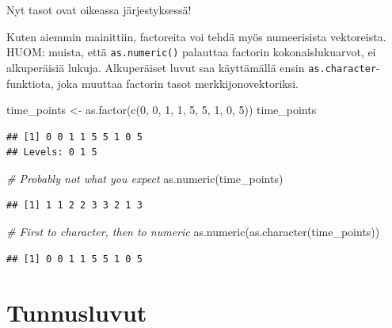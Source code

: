 \documentclass[
]{book}
\newenvironment{Shaded}{\begin{snugshade}}{\end{snugshade}}
\newcommand{\CommentTok}[1]{\textcolor[rgb]{0.56,0.35,0.01}{\textit{#1}}}
\newcommand{\DecValTok}[1]{\textcolor[rgb]{0.00,0.00,0.81}{#1}}
\newcommand{\FunctionTok}[1]{\textcolor[rgb]{0.00,0.00,0.00}{#1}}
\newcommand{\NormalTok}[1]{#1}
\newcommand{\OtherTok}[1]{\textcolor[rgb]{0.56,0.35,0.01}{#1}}
\begin{document}
Nyt tasot ovat oikeassa järjestyksessä!

Kuten aiemmin mainittiin, factoreita voi tehdä myös numeerisista vektoreista. HUOM: muista, että \texttt{as.numeric()} palauttaa factorin kokonaislukuarvot, ei alkuperäisiä lukuja. Alkuperäiset luvut saa käyttämällä ensin \texttt{as.character}-funktiota, joka muuttaa factorin tasot merkkijonovektoriksi.

\begin{Shaded}
\begin{Highlighting}[]
\NormalTok{time\_points }\OtherTok{\textless{}{-}} \FunctionTok{as.factor}\NormalTok{(}\FunctionTok{c}\NormalTok{(}\DecValTok{0}\NormalTok{, }\DecValTok{0}\NormalTok{, }\DecValTok{1}\NormalTok{, }\DecValTok{1}\NormalTok{, }\DecValTok{5}\NormalTok{, }\DecValTok{5}\NormalTok{, }\DecValTok{1}\NormalTok{, }\DecValTok{0}\NormalTok{, }\DecValTok{5}\NormalTok{))}
\NormalTok{time\_points}
\end{Highlighting}
\end{Shaded}

\begin{verbatim}
## [1] 0 0 1 1 5 5 1 0 5
## Levels: 0 1 5
\end{verbatim}

\begin{Shaded}
\begin{Highlighting}[]
\CommentTok{\# Probably not what you expect}
\FunctionTok{as.numeric}\NormalTok{(time\_points)}
\end{Highlighting}
\end{Shaded}

\begin{verbatim}
## [1] 1 1 2 2 3 3 2 1 3
\end{verbatim}

\begin{Shaded}
\begin{Highlighting}[]
\CommentTok{\# First to character, then to numeric}
\FunctionTok{as.numeric}\NormalTok{(}\FunctionTok{as.character}\NormalTok{(time\_points))}
\end{Highlighting}
\end{Shaded}

\begin{verbatim}
## [1] 0 0 1 1 5 5 1 0 5
\end{verbatim}

\hypertarget{statistics}{%
\chapter{Tunnusluvut}\label{statistics}}
\end{document}
